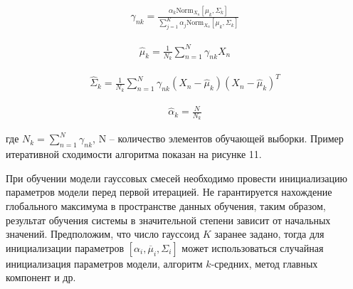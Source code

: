 \begin{gather}
\gamma_{nk} = \frac{\alpha_k \text{Norm}_{X_n}[\mu_k,\Sigma_k]}{\sum_{j=1}^{K} \alpha_j \text{Norm}_{X_n}[\mu_k,\Sigma_k]}
\end{gather}

\begin{gather}
\hat{\mu}_k = \frac{1}{N_k} \sum\limits_{n=1}^{N} \gamma_{nk} X_n
\end{gather}

\begin{gather}
\hat{\Sigma}_k = \frac{1}{N_k} \sum\limits_{n=1}^{N} \gamma_{nk} (X_n - \hat{\mu}_k) (X_n - \hat{\mu}_k)^T
\end{gather}

\begin{gather}
\hat{\alpha}_k = \frac{N}{N_k}
\end{gather}

где $N_k = \sum_{n=1}^{N} \gamma_{nk}$, N -- количество элементов обучающей выборки. Пример итеративной сходимости алгоритма показан на рисунке 11.

При обучении модели гауссовых смесей необходимо провести инициализацию параметров модели перед первой итерацией. Не гарантируется нахождение глобального максимума в пространстве данных обучения, таким образом, результат обучения системы в значительной степени зависит от начальных значений. Предположим, что число гауссоид $K$ заранее задано, тогда для инициализации параметров $[\alpha_i, \overline{\mu}_i, \Sigma_i]$ может использоваться случайная инициализация параметров модели, алгоритм $k$-средних, метод главных компонент и др.

